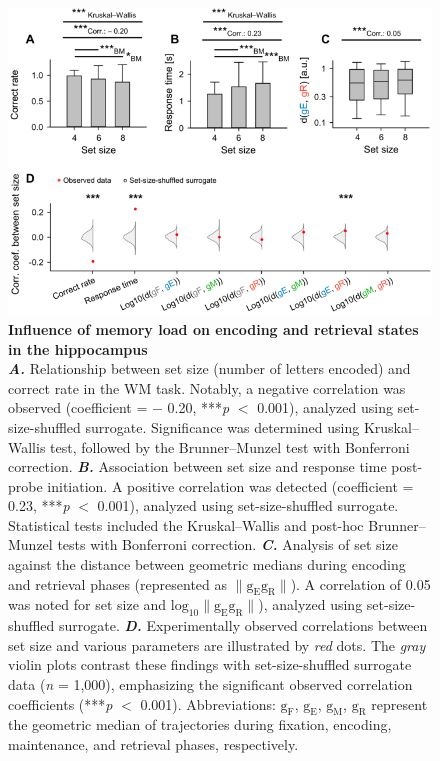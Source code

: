 \documentclass[final,3p,times,twocolumn]{elsarticle}
\begin{document}
        \clearpage
        \begin{figure}[ht]
        	\centering
            \includegraphics[width=1\textwidth]{./src/figures/.png/Figure_ID_03.png}
        	\caption{\textbf{
Influence of memory load on encoding and retrieval states in the hippocampus
}
\smallskip
\\
\textbf{\textit{A.}} Relationship between set size (number of letters encoded) and correct rate in the WM task. Notably, a negative correlation was observed (coefficient = $-$ 0.20, ***\textit{p} $<$ 0.001), analyzed using set-size-shuffled surrogate. Significance was determined using Kruskal--Wallis test, followed by the Brunner--Munzel test with Bonferroni correction. \textbf{\textit{B.}}  Association between set size and response time post-probe initiation. A positive correlation was detected (coefficient = 0.23, ***\textit{p} $<$ 0.001), analyzed using set-size-shuffled surrogate. Statistical tests included the Kruskal--Wallis and post-hoc Brunner--Munzel tests with Bonferroni correction. \textbf{\textit{C.}}  Analysis of set size against the distance between geometric medians during encoding and retrieval phases (represented as $\lVert \mathrm{g_{E}g_{R}} \rVert$). A correlation of 0.05 was noted for set size and $\mathrm{log_{10}{\lVert g_{E}g_{R} \rVert}}$), analyzed using set-size-shuffled surrogate. \textbf{\textit{D.}}  Experimentally observed correlations between set size and various parameters are illustrated by \textit{red} dots. The \textit{gray} violin plots contrast these findings with set-size-shuffled surrogate data (\textit{n} = 1,000), emphasizing the significant observed correlation coefficients (***\textit{p} $<$ 0.001). Abbreviations: $\mathrm{g_{F}}$, $\mathrm{g_{E}}$, $\mathrm{g_{M}}$, $\mathrm{g_{R}}$ represent the geometric median of trajectories during fixation, encoding, maintenance, and retrieval phases, respectively.
}
        	\label{fig:03}
        \end{figure}
\end{document}
